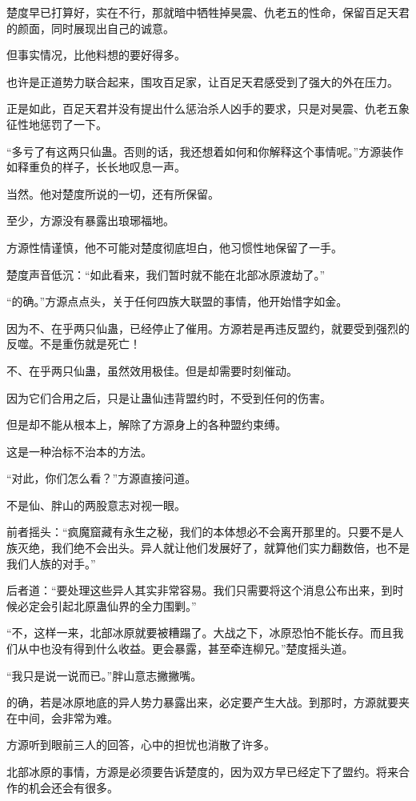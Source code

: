 \begin{this_body}
楚度早已打算好，实在不行，那就暗中牺牲掉昊震、仇老五的性命，保留百足天君的颜面，同时展现出自己的诚意。

但事实情况，比他料想的要好得多。

也许是正道势力联合起来，围攻百足家，让百足天君感受到了强大的外在压力。

正是如此，百足天君并没有提出什么惩治杀人凶手的要求，只是对昊震、仇老五象征性地惩罚了一下。

“多亏了有这两只仙蛊。否则的话，我还想着如何和你解释这个事情呢。”方源装作如释重负的样子，长长地叹息一声。

当然。他对楚度所说的一切，还有所保留。

至少，方源没有暴露出琅琊福地。

方源性情谨慎，他不可能对楚度彻底坦白，他习惯性地保留了一手。

楚度声音低沉：“如此看来，我们暂时就不能在北部冰原渡劫了。”

“的确。”方源点点头，关于任何四族大联盟的事情，他开始惜字如金。

因为不、在乎两只仙蛊，已经停止了催用。方源若是再违反盟约，就要受到强烈的反噬。不是重伤就是死亡！

不、在乎两只仙蛊，虽然效用极佳。但是却需要时刻催动。

因为它们合用之后，只是让蛊仙违背盟约时，不受到任何的伤害。

但是却不能从根本上，解除了方源身上的各种盟约束缚。

这是一种治标不治本的方法。

“对此，你们怎么看？”方源直接问道。

不是仙、胖山的两股意志对视一眼。

前者摇头：“疯魔窟藏有永生之秘，我们的本体想必不会离开那里的。只要不是人族灭绝，我们绝不会出头。异人就让他们发展好了，就算他们实力翻数倍，也不是我们人族的对手。”

后者道：“要处理这些异人其实非常容易。我们只需要将这个消息公布出来，到时候必定会引起北原蛊仙界的全力围剿。”

“不，这样一来，北部冰原就要被糟蹋了。大战之下，冰原恐怕不能长存。而且我们从中也没有得到什么收益。更会暴露，甚至牵连柳兄。”楚度摇头道。

“我只是说一说而已。”胖山意志撇撇嘴。

的确，若是冰原地底的异人势力暴露出来，必定要产生大战。到那时，方源就要夹在中间，会非常为难。

方源听到眼前三人的回答，心中的担忧也消散了许多。

北部冰原的事情，方源是必须要告诉楚度的，因为双方早已经定下了盟约。将来合作的机会还会有很多。


\end{this_body}
